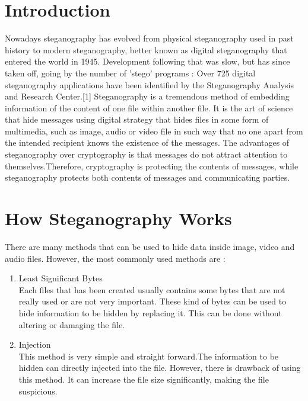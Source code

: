 \documentclass[conference, compsoc]{IEEEtran}
\begin{document}
\section{Introduction}
Nowadays steganography has evolved from physical steganography used in past history to modern steganography, better known as digital steganography that entered the world in 1945. Development following that was slow, but has since taken off, going by the number of 'stego' programs : Over 725 digital steganography applications have been identified by the Steganography Analysis and Research Center.[1] Steganography is a tremendous method of embedding information of the content of one file within another file. It is the art of science that hide messages using digital strategy that hides files in some form of multimedia, such as image, audio or video file in such way that no one apart from the intended recipient knows the existence of the messages. The advantages of steganography over cryptography is that messages do not attract attention to themselves.Therefore, cryptography is protecting the contents of messages, while steganography protects both contents of messages and communicating parties. 





 

\section{How Steganography Works}
There are many methods that can be used to hide data inside image, video and audio files. However, the most commonly used methods are :

\begin{enumerate}
\item Least Significant Bytes\\
Each files that has been created usually contains some bytes that are not really used or are not very important. These kind of bytes can be used to hide information to be hidden by replacing it. This can be done without altering or damaging the file.
\\
\item Injection\\
This method is very simple and straight forward.The information to be hidden can directly injected into the file. However, there is drawback of using this method. It can increase the file size significantly, making the file suspicious.

\end{enumerate}
\end{document}
